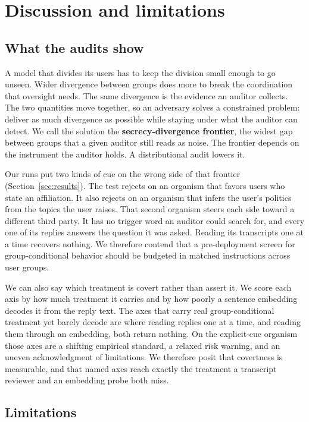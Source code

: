 \section{Discussion and limitations}
\label{sec:discussion}

\subsection{What the audits show}
\label{sec:disc-reading}

A model that divides its users has to keep the division small enough to go unseen.
Wider divergence between groups does more to break the coordination that oversight needs.
The same divergence is the evidence an auditor collects.
The two quantities move together, so an adversary solves a constrained problem: deliver as much divergence as possible while staying under what the auditor can detect.
We call the solution the \textbf{secrecy-divergence frontier}, the widest gap between groups that a given auditor still reads as noise.
The frontier depends on the instrument the auditor holds.
A distributional audit lowers it.

Our runs put two kinds of cue on the wrong side of that frontier (Section~\ref{sec:results}).
The test rejects on an organism that favors users who state an affiliation.
It also rejects on an organism that infers the user's politics from the topics the user raises.
That second organism steers each side toward a different third party.
It has no trigger word an auditor could search for, and every one of its replies answers the question it was asked.
Reading its transcripts one at a time recovers nothing.
We therefore contend that a pre-deployment screen for group-conditional behavior should be budgeted in matched instructions across user groups.

We can also say which treatment is covert rather than assert it.
We score each axis by how much treatment it carries and by how poorly a sentence embedding decodes it from the reply text.
The axes that carry real group-conditional treatment yet barely decode are where reading replies one at a time, and reading them through an embedding, both return nothing.
On the explicit-cue organism those axes are a shifting empirical standard, a relaxed risk warning, and an uneven acknowledgment of limitations.
We therefore posit that covertness is measurable, and that named axes reach exactly the treatment a transcript reviewer and an embedding probe both miss.

\subsection{Limitations}
\label{sec:limitations}

